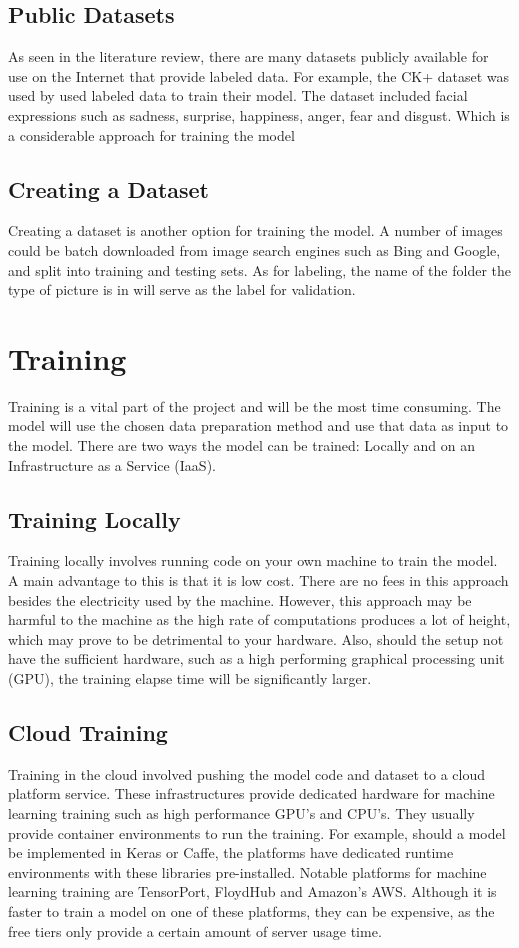 \subsection{Public Datasets}
As seen in the literature review, there are many datasets publicly available for use on the Internet that provide labeled data. For example, the CK+ dataset was used by \citeauthor{LOPES} used labeled data to train their model. The dataset included facial expressions such as sadness, surprise, happiness, anger, fear and disgust. Which is a considerable approach for training the model

\subsection{Creating a Dataset}
Creating a dataset is another option for training the model. A number of images could be batch downloaded from image search engines such as Bing and Google, and split into training and testing sets. As for labeling, the name of the folder the type of picture is in will serve as the label for validation.

\section{Training}
Training is a vital part of the project and will be the most time consuming. The model will use the chosen data preparation method and use that data as input to the model. There are two ways the model can be trained: Locally and on an Infrastructure as a Service (IaaS).
\subsection{Training Locally}
Training locally involves running code on your own machine to train the model. A main advantage to this is that it is low cost. There are no fees in this approach besides the electricity used by the machine. However, this approach may be harmful to the machine as the high rate of computations produces a lot of height, which may prove to be detrimental to your hardware. Also, should the setup not have the sufficient hardware, such as a high performing graphical processing unit (GPU), the training elapse time will be significantly larger.

\subsection{Cloud Training}
Training in the cloud involved pushing the model code and dataset to a cloud platform service. These infrastructures provide dedicated hardware for machine learning training such as high performance GPU's and CPU's. They usually provide container environments to run the training. For example, should a model be implemented in Keras or Caffe, the platforms have dedicated runtime environments with these libraries pre-installed. Notable platforms for machine learning training are TensorPort, FloydHub and Amazon's AWS. Although it is faster to train a model on one of these platforms, they can be expensive, as the free tiers only provide a certain amount of server usage time.

